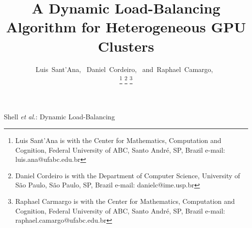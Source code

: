 \documentclass[journal]{IEEEtran}
\begin{document}
%
\title{A Dynamic Load-Balancing Algorithm for Heterogeneous GPU Clusters}
%
%
%

\author{Luis~Sant'Ana,~
        Daniel~Cordeiro,~
        and~Raphael~Camargo,~%

\thanks{Luis Sant'Ana is with the Center for Mathematics, Computation and Cognition, Federal University of ABC, Santo Andr\'{e}, SP, Brazil e-mail: luis.ana@ufabc.edu.br}%
\thanks{Daniel Cordeiro is with the Department of Computer Science, University of S\~{a}o Paulo, S\~{a}o Paulo, SP, Brazil e-mail: danielc@ime.usp.br }%
\thanks{Raphael Carmargo is with the Center for Mathematics, Computation and Cognition, Federal University of ABC, Santo Andr\'{e}, SP, Brazil e-mail: raphael.camargo@ufabc.edu.br}}

% 
%



%
{Shell \MakeLowercase{\textit{et al.}}:  Dynamic Load-Balancing}
% 
\end{document}
